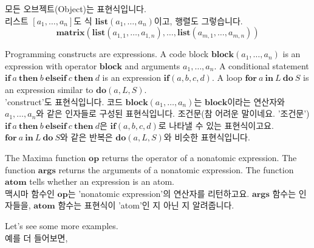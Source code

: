 \documentclass[12pt]{article}
\begin{document}
모든 오브젝트(Object)는 표현식입니다. \\
리스트 $[a_1, \ldots, a_n]$도 식 $\mathbf{list}(a_1, \ldots, a_n)$이고, 행렬도 그렇습니다.
\[
\mathbf{matrix}(\mathbf{list}(a_{1,1}, \ldots, a_{1,n}), \ldots, \mathbf{list}(a_{m,1}, \ldots, a_{m,n}))
\]

Programming constructs are expressions. 
A code block $\mathbf{block} (a_1, \ldots, a_n)$ is an expression with operator $\mathbf{block}$
and arguments $a_1, \ldots, a_n$.
A conditional statement $\mathbf{if\ } a \mathbf{\ then\ } b \mathbf{\ elseif\ } c \mathbf{\ then\ } d$
is an expression $\mathbf{if}(a, b, c, d)$.
A loop $\mathbf{for\ } a \mathbf{\ in\ } L \mathbf{\ do\ } S$ is an expression similar to $\mathbf{do}(a, L, S)$. \\

'construct'도 표현식입니다.
코드 $\mathbf{block} (a_1, \ldots, a_n)$는 $\mathbf{block}$이라는 연산자와 $a_1, \ldots, a_n$와 같은 인자들로 구성된 표현식입니다. 
조건문(참 어려운 말이네요. '조건문') $\mathbf{if\ } a \mathbf{\ then\ } b \mathbf{\ elseif\ } c \mathbf{\ then\ } d$은 
$\mathbf{if}(a, b, c, d)$로 나타낼 수 있는 표현식이고요. $\mathbf{for\ } a \mathbf{\ in\ } L \mathbf{\ do\ } S$와 
같은 반복은 $\mathbf{do}(a, L, S)$와 비슷한  표현식입니다.


The Maxima function $\mathbf{op}$ returns the operator of a nonatomic expression.
The function $\mathbf{args}$ returns the arguments of a nonatomic expression.
The function $\mathbf{atom}$ tells whether an expression is an atom. \\

맥시마 함수인 $\mathbf{op}$는 'nonatomic expression'의 연산자를 리턴하고요.
$\mathbf{args}$ 함수는 인자들을,  $\mathbf{atom}$ 함수는 표현식이 'atom'인 지 아닌 지 알려줍니다.

Let's see some more examples. \\
예를 더 들어보면, 
\end{document}
